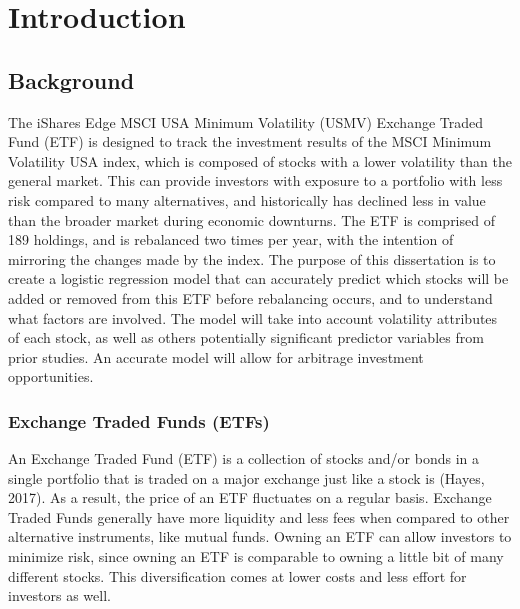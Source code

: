 \documentclass[12pt,twoside]{reedthesis}
\theoremstyle{definition}
\theoremstyle{definition}
\theoremstyle{definition}
\theoremstyle{remark}
\begin{document}
\mainmatter %
\pagestyle{fancyplain} %

\chapter{Introduction}\label{introduction}

\section{Background}\label{background}

The iShares Edge MSCI USA Minimum Volatility (USMV) Exchange Traded Fund
(ETF) is designed to track the investment results of the MSCI Minimum
Volatility USA index, which is composed of stocks with a lower
volatility than the general market. This can provide investors with
exposure to a portfolio with less risk compared to many alternatives,
and historically has declined less in value than the broader market
during economic downturns. The ETF is comprised of 189 holdings, and is
rebalanced two times per year, with the intention of mirroring the
changes made by the index. The purpose of this dissertation is to create
a logistic regression model that can accurately predict which stocks
will be added or removed from this ETF before rebalancing occurs, and to
understand what factors are involved. The model will take into account
volatility attributes of each stock, as well as others potentially
significant predictor variables from prior studies. An accurate model
will allow for arbitrage investment opportunities.

\subsection{Exchange Traded Funds
(ETFs)}\label{exchange-traded-funds-etfs}

An Exchange Traded Fund (ETF) is a collection of stocks and/or bonds in
a single portfolio that is traded on a major exchange just like a stock
is (Hayes, 2017). As a result, the price of an ETF fluctuates on a
regular basis. Exchange Traded Funds generally have more liquidity and
less fees when compared to other alternative instruments, like mutual
funds. Owning an ETF can allow investors to minimize risk, since owning
an ETF is comparable to owning a little bit of many different stocks.
This diversification comes at lower costs and less effort for investors
as well.
\end{document}
